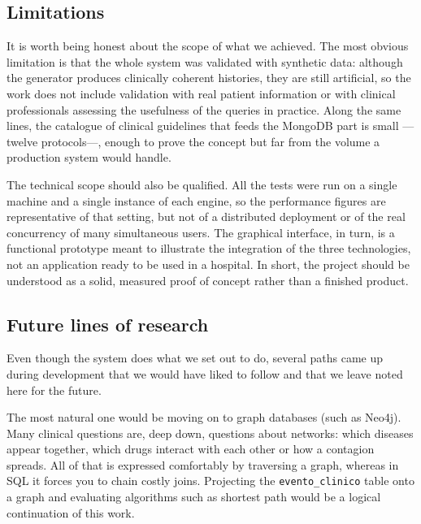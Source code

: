 \documentclass[../main.tex]{subfiles}
\begin{document}
\subsection{Limitations}

It is worth being honest about the scope of what we achieved. The most obvious limitation is that the whole system was validated with synthetic data: although the generator produces clinically coherent histories, they are still artificial, so the work does not include validation with real patient information or with clinical professionals assessing the usefulness of the queries in practice. Along the same lines, the catalogue of clinical guidelines that feeds the MongoDB part is small ---twelve protocols---, enough to prove the concept but far from the volume a production system would handle.

The technical scope should also be qualified. All the tests were run on a single machine and a single instance of each engine, so the performance figures are representative of that setting, but not of a distributed deployment or of the real concurrency of many simultaneous users. The graphical interface, in turn, is a functional prototype meant to illustrate the integration of the three technologies, not an application ready to be used in a hospital. In short, the project should be understood as a solid, measured proof of concept rather than a finished product.

\subsection{Future lines of research}

Even though the system does what we set out to do, several paths came up during development that we would have liked to follow and that we leave noted here for the future.

The most natural one would be moving on to graph databases (such as Neo4j). Many clinical questions are, deep down, questions about networks: which diseases appear together, which drugs interact with each other or how a contagion spreads. All of that is expressed comfortably by traversing a graph, whereas in SQL it forces you to chain costly joins. Projecting the \texttt{evento\_clinico} table onto a graph and evaluating algorithms such as shortest path would be a logical continuation of this work.
\end{document}
